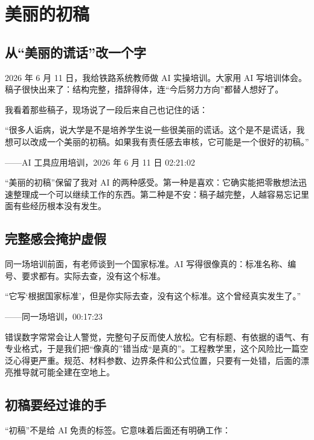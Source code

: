 \chapter{美丽的初稿}

\section{从“美丽的谎话”改一个字}

2026 年 6 月 11 日，我给铁路系统教师做 AI 实操培训。大家用 AI 写培训体会。稿子很快出来了：结构完整，措辞得体，连“今后努力方向”都替人想好了。

我看着那些稿子，现场说了一段后来自己也记住的话：

\begin{shiyu-inline}
``很多人诟病，说大学是不是培养学生说一些很美丽的谎话。这个是不是谎话，我想可以改成一个美丽的初稿。如果我有责任感去审核，它可能是一个很好的初稿。''

\hfill ——AI 工具应用培训，2026 年 6 月 11 日 02:21:02
\end{shiyu-inline}

“美丽的初稿”保留了我对 AI 的两种感受。第一种是喜欢：它确实能把零散想法迅速整理成一个可以继续工作的东西。第二种是不安：稿子越完整，人越容易忘记里面有些经历根本没有发生。

\section{完整感会掩护虚假}

同一场培训前面，有老师谈到一个国家标准。AI 写得很像真的：标准名称、编号、要求都有。实际去查，没有这个标准。

\begin{shiyu-inline}
``它写‘根据国家标准’，但是你实际去查，没有这个标准。这个曾经真实发生了。''

\hfill ——同一场培训，00:17:23
\end{shiyu-inline}

错误数字常常会让人警觉，完整句子反而使人放松。它有标题、有依据的语气、有专业格式，于是我们把“像真的”错当成“是真的”。工程教学里，这个风险比一篇空泛心得更严重。规范、材料参数、边界条件和公式位置，只要有一处错，后面的漂亮推导就可能全建在空地上。

\section{初稿要经过谁的手}

“初稿”不是给 AI 免责的标签。它意味着后面还有明确工作：

